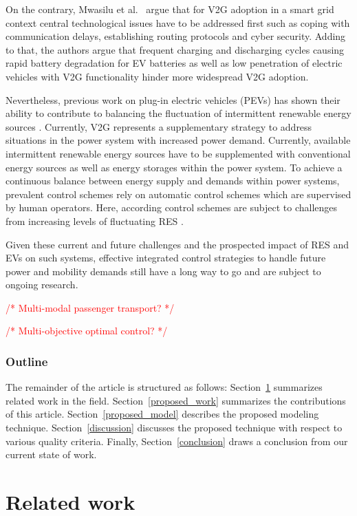 \documentclass[conference]{IEEEtran}
\newcommand{\todo}[1]{\textcolor{red}{/* #1 */}}
\begin{document}
	On the contrary, Mwasilu et al.~\cite{mwasilu2014electric} argue that for V2G adoption in a smart grid context central technological issues have to be addressed first such as coping with communication delays, establishing routing protocols and cyber security. Adding to that, the authors argue that frequent charging and discharging cycles causing rapid battery degradation for EV batteries as well as low penetration of electric vehicles with V2G functionality hinder more widespread V2G adoption.
	
	Nevertheless, previous work on plug-in electric vehicles (PEVs) has shown their ability to contribute to balancing the fluctuation of intermittent renewable energy sources \cite{dallinger2012grid}. Currently, V2G represents a supplementary strategy to address situations in the power system with increased power demand. Currently, available intermittent renewable energy sources have to be supplemented with conventional energy sources as well as energy storages within the power system. To achieve a continuous balance between energy supply and demands within power systems, prevalent control schemes rely on automatic control schemes which are supervised by human operators. Here, according control schemes are subject to challenges from increasing levels of fluctuating RES \cite{heussen2012unified}.
	
	Given these current and future challenges and the prospected impact of RES and EVs on such systems, effective integrated control strategies to handle future power and mobility demands still have a long way to go and are subject to ongoing research.
	
	\todo{Multi-modal passenger transport?}
	
	\todo{Multi-objective optimal control?}
	
	\subsubsection*{Outline}
	
	The remainder of the article is structured as follows: Section~\ref{related_work} summarizes related work in the field. Section~\ref{proposed_work} summarizes the contributions of this article. Section~\ref{proposed_model} describes the proposed modeling technique. Section~\ref{discussion} discusses the proposed technique with respect to various quality criteria. Finally, Section~\ref{conclusion} draws a conclusion from our current state of work.
	
	\section{Related work}
	\label{related_work}
	
\end{document}
